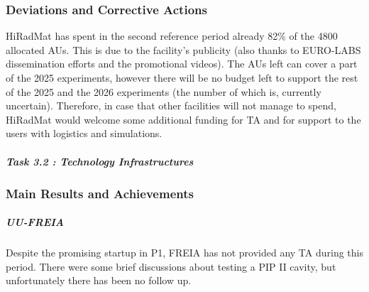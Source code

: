 \subsubsection*{Deviations and Corrective Actions}

HiRadMat has spent in the second reference period already 82\% of the 4800 allocated AUs. This is due to the facility's publicity (also thanks to EURO-LABS dissemination efforts and the promotional videos). The AUs left can cover a part of the 2025 experiments, however there will be no budget left to support the rest of the 2025 and the 2026 experiments (the number of which is, currently uncertain). Therefore, in case that other facilities will not manage to spend, HiRadMat would welcome some additional funding for TA and for support to the users with logistics and simulations. 


\subparagraph{Task 3.2 : Technology Infrastructures} \mbox{}


\subsubsection*{Main Results and Achievements}

\subparagraph{UU-FREIA}

Despite the promising startup in P1, FREIA has not provided any TA during this period. There were some brief discussions about testing a PIP II cavity, but unfortunately there has been no follow up.

 
 


